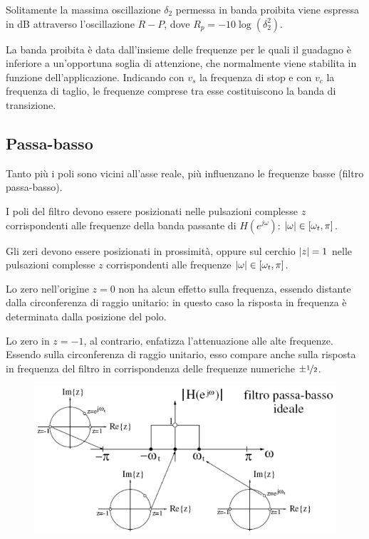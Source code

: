 Solitamente la massima oscillazione $\delta_2$ permessa in banda proibita viene espressa in dB attraverso l'oscillazione $R-P$, dove $R_p = -10\log(\delta_2^2)$. 

La banda proibita è data dall'insieme delle frequenze per le quali il guadagno è inferiore a un'opportuna soglia di attenzione, che normalmente viene stabilita in funzione dell'applicazione. Indicando con $v_s$ la frequenza di stop e con $v_c$ la frequenza di taglio, le frequenze comprese tra esse costituiscono la banda di transizione.

\subsection{Passa-basso}
Tanto più i poli sono vicini all'asse reale, più influenzano le frequenze basse (filtro passa-basso).
 
 I poli del filtro devono essere posizionati nelle pulsazioni complesse $z$ corrispondenti alle frequenze della banda passante di $H(e^{j\omega})$: $\left|\omega\right| \in [\omega_t, \pi]$.
 
 Gli zeri devono essere posizionati in prossimità, oppure sul cerchio $\left|z\right| = 1$ nelle pulsazioni complesse $z$ corrispondenti alle frequenze $\left|\omega\right| \in [\omega_t, \pi]$.
 
Lo zero nell'origine $z = 0$ non ha alcun effetto sulla frequenza, essendo distante dalla circonferenza di raggio unitario: in questo caso la risposta in frequenza è determinata dalla posizione del polo.

Lo zero in $z = -1$, al contrario, enfatizza l'attenuazione alle alte frequenze. Essendo sulla circonferenza di raggio unitario, esso compare anche sulla risposta in frequenza del filtro in corrispondenza delle frequenze numeriche $\pm \nicefrac{1}{2}$.

\begin{figure}[h]
	\centering
	\includegraphics[scale=0.4]{Lezioni/Immagini/passabasso}
\end{figure}

